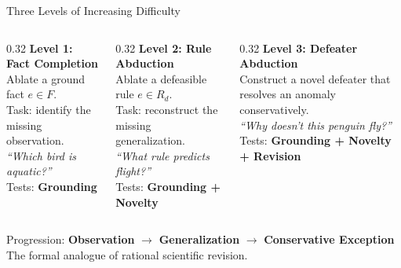 \documentclass[aspectratio=169]{beamer}
\begin{document}
\begin{frame}{Three Levels of Increasing Difficulty}

\begin{columns}[T]
\begin{column}{0.32\textwidth}
\textbf{\textcolor{defabgreen}{Level 1: Fact Completion}}\\[4pt]
\small
Ablate a ground fact $e \in F$.\\[4pt]
Task: identify the missing observation.\\[6pt]
\textit{``Which bird is aquatic?''}\\[6pt]
Tests: \textbf{Grounding}
\end{column}

\begin{column}{0.32\textwidth}
\textbf{\textcolor{defabgold}{Level 2: Rule Abduction}}\\[4pt]
\small
Ablate a defeasible rule $e \in R_d$.\\[4pt]
Task: reconstruct the missing generalization.\\[6pt]
\textit{``What rule predicts flight?''}\\[6pt]
Tests: \textbf{Grounding + Novelty}
\end{column}

\begin{column}{0.32\textwidth}
\textbf{\textcolor{defabredish}{Level 3: Defeater Abduction}}\\[4pt]
\small
Construct a novel defeater that resolves an anomaly conservatively.\\[6pt]
\textit{``Why doesn't this penguin fly?''}\\[6pt]
Tests: \textbf{Grounding + Novelty + Revision}
\end{column}
\end{columns}

\vspace{1em}
\begin{center}
\small
Progression: \textbf{Observation} $\longrightarrow$ \textbf{Generalization} $\longrightarrow$ \textbf{Conservative Exception}\\[4pt]
The formal analogue of rational scientific revision.
\end{center}
\end{frame}
\end{document}
